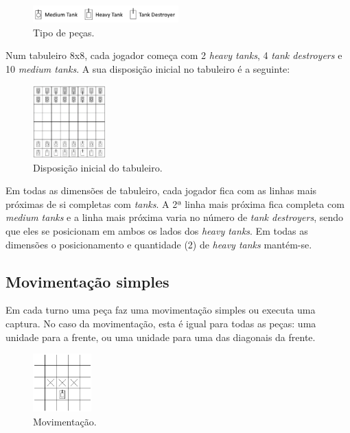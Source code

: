 \documentclass[a4paper,11pt,portuguese]{article}
\begin{document}
\begin{figure}[H]
    \centering
    \includegraphics[width=0.5\textwidth]{imgs/pecas.png}
    \caption{Tipo de peças.}
    \label{fig:pecas}
\end{figure}

\noindent Num tabuleiro 8x8, cada jogador começa com 2 \textit{heavy tanks}, 4 \textit{tank destroyers}
e 10 \textit{medium tanks}. A sua disposição inicial no tabuleiro é a seguinte:

\begin{figure}[H]
    \centering
    \includegraphics[width=0.25\textwidth]{imgs/board.png}
    \caption{Disposição inicial do tabuleiro.}
    \label{fig:board}
\end{figure}

\noindent Em todas as dimensões de tabuleiro, cada jogador fica com as linhas mais próximas de si completas com \textit{tanks}.
A 2ª linha mais próxima fica completa com \textit{medium tanks} e a linha mais próxima varia no número
de \textit{tank destroyers}, sendo que eles se posicionam em ambos os lados dos \textit{heavy tanks}.
Em todas as dimensões o posicionamento e quantidade (2) de \textit{heavy tanks} mantém-se.

\subsection{Movimentação simples}
Em cada turno uma peça faz uma movimentação simples ou executa uma captura. No caso 
da movimentação, esta é igual para todas as peças: uma unidade para a frente, ou uma 
unidade para uma das diagonais da frente.

\begin{figure}[H]
    \centering
    \includegraphics[width=0.2\textwidth]{imgs/movement.png}
    \caption{Movimentação.}
    \label{fig:movemente}
\end{figure}
\end{document}
